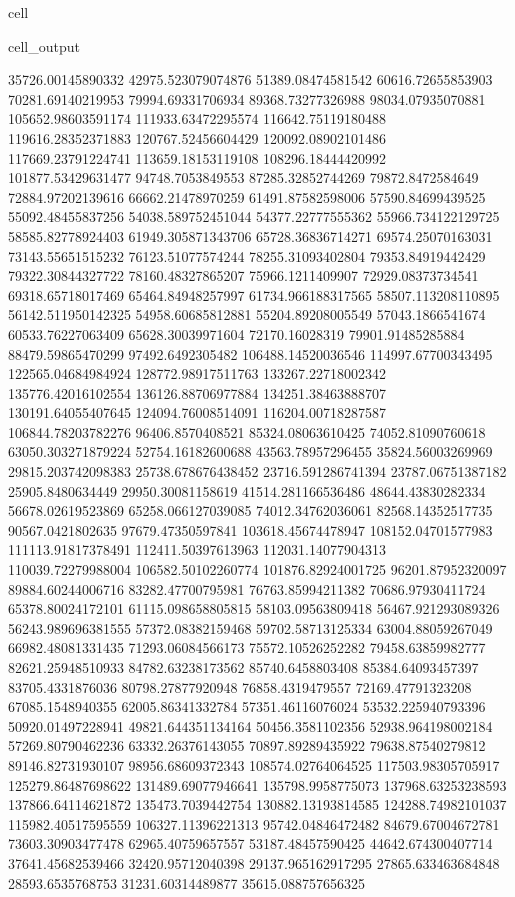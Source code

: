 \documentclass[letterpaper,10pt,english]{jupyterBook}
\begin{document}
\begin{sphinxuseclass}{cell}
\begin{sphinxVerbatimOutput}
\begin{sphinxuseclass}{cell_output}
\begin{sphinxVerbatim}[commandchars=\\\{\}]
35726.00145890332  42975.523079074876  51389.08474581542  60616.72655853903  70281.69140219953  79994.69331706934  89368.73277326988  98034.07935070881  105652.98603591174  111933.63472295574  116642.75119180488  119616.28352371883  120767.52456604429  120092.08902101486  117669.23791224741  113659.18153119108  108296.18444420992  101877.53429631477  94748.7053849553  87285.32852744269  79872.8472584649  72884.97202139616  66662.21478970259  61491.87582598006  57590.84699439525  55092.48455837256  54038.589752451044  54377.22777555362  55966.734122129725  58585.82778924403  61949.305871343706  65728.36836714271  69574.25070163031  73143.55651515232  76123.51077574244  78255.31093402804  79353.84919442429  79322.30844327722  78160.48327865207  75966.1211409907  72929.08373734541  69318.65718017469  65464.84948257997  61734.966188317565  58507.113208110895  56142.511950142325  54958.60685812881  55204.89208005549  57043.1866541674  60533.76227063409  65628.30039971604  72170.16028319  79901.91485285884  88479.59865470299  97492.6492305482  106488.14520036546  114997.67700343495  122565.04684984924  128772.98917511763  133267.22718002342  135776.42016102554  136126.88706977884  134251.38463888707  130191.64055407645  124094.76008514091  116204.00718287587  106844.78203782276  96406.8570408521  85324.08063610425  74052.81090760618  63050.303271879224  52754.16182600688  43563.78957296455  35824.56003269969  29815.203742098383  25738.678676438452  23716.591286741394  23787.06751387182  25905.8480634449  29950.30081158619  
41514.281166536486  48644.43830282334  56678.02619523869  65258.066127039085  74012.34762036061  82568.14352517735  90567.0421802635  97679.47350597841  103618.45674478947  108152.04701577983  111113.91817378491  112411.50397613963  112031.14077904313  110039.72279988004  106582.50102260774  101876.82924001725  96201.87952320097  89884.60244006716  83282.47700795981  76763.85994211382  70686.97930411724  65378.80024172101  61115.098658805815  58103.09563809418  56467.921293089326  56243.989696381555  57372.08382159468  59702.58713125334  63004.88059267049  66982.48081331435  71293.06084566173  75572.10526252282  79458.63859982777  82621.25948510933  84782.63238173562  85740.6458803408  85384.64093457397  83705.4331876036  80798.27877920948  76858.4319479557  72169.47791323208  67085.1548940355  62005.86341332784  57351.46116076024  53532.225940793396  50920.01497228941  49821.644351134164  50456.3581102356  52938.964198002184  57269.80790462236  63332.26376143055  70897.89289435922  79638.87540279812  89146.82731930107  98956.68609372343  108574.02764064525  117503.98305705917  125279.86487698622  131489.69077946641  135798.9958775073  137968.63253238593  137866.64114621872  135473.7039442754  130882.13193814585  124288.74982101037  115982.40517595559  106327.11396221313  95742.04846472482  84679.67004672781  73603.30903477478  62965.40759657557  53187.48457590425  44642.674300407714  37641.45682539466  32420.95712040398  29137.965162917295  27865.633463684848  28593.6535768753  31231.60314489877  35615.088757656325  

\end{sphinxVerbatim}
\end{sphinxuseclass}
\end{sphinxVerbatimOutput}
\end{sphinxuseclass}
\end{document}
